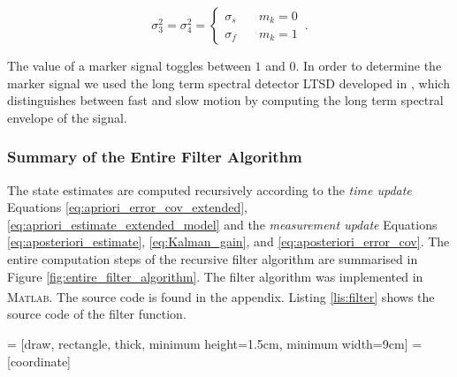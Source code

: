 \begin{equation}
  \sigma^2_3 = \sigma^2_4 = \begin{cases}
  	\sigma_s & \quad m_k = 0 \\
  	\sigma_f & \quad m_k = 1
  \end{cases}\,.
\end{equation}

\noindent
The value of a marker signal toggles between $1$ and $0$. In order to determine the marker signal we used the long term spectral detector \gls{LTSD} developed in \cite{olivares_vicente_gaitwatch_2013}, which distinguishes between fast and slow motion by computing the long term spectral envelope of the signal.

\subsubsection{Summary of the Entire Filter Algorithm}

The state estimates are computed recursively according to the \emph{time update} Equations \ref{eq:apriori_error_cov_extended}, \ref{eq:apriori_estimate_extended_model} and the \emph{measurement update} Equations \ref{eq:aposteriori_estimate}, \ref{eq:Kalman_gain}, and \ref{eq:aposteriori_error_cov}. The entire computation steps of the recursive filter algorithm are summarised in Figure \ref{fig:entire_filter_algorithm}. The filter algorithm was implemented in \textsc{Matlab}\textsuperscript{\textregistered}. The source code is found in the appendix. Listing \ref{lis:filter} shows the source code of the filter function. 

 = [draw, rectangle, thick, 
    minimum height=1.5cm, minimum width=9cm]
 = [coordinate]

